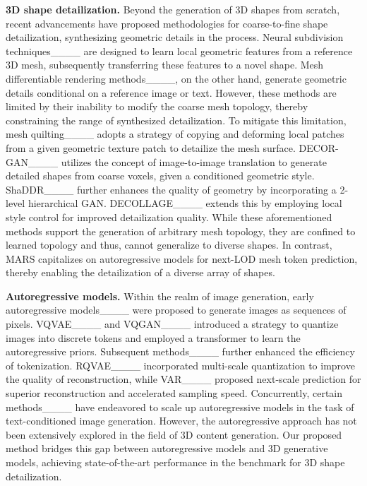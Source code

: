 \noindent\textbf{3D shape detailization.}
Beyond the generation of 3D shapes from scratch, recent advancements have proposed methodologies for coarse-to-fine shape detailization, synthesizing geometric details in the process. Neural subdivision techniques____ are designed to learn local geometric features from a reference 3D mesh, subsequently transferring these features to a novel shape. Mesh differentiable rendering methods____, on the other hand, generate geometric details conditional on a reference image or text. However, these methods are limited by their inability to modify the coarse mesh topology, thereby constraining the range of synthesized detailization. To mitigate this limitation, mesh quilting____ adopts a strategy of copying and deforming local patches from a given geometric texture patch to detailize the mesh surface. DECOR-GAN____ utilizes the concept of image-to-image translation to generate detailed shapes from coarse voxels, given a conditioned geometric style. ShaDDR____ further enhances the quality of geometry by incorporating a 2-level hierarchical GAN. DECOLLAGE____ extends this by employing local style control for improved detailization quality. While these aforementioned methods support the generation of arbitrary mesh topology, they are confined to learned topology and thus, cannot generalize to diverse shapes. In contrast, MARS capitalizes on autoregressive models for next-LOD mesh token prediction, thereby enabling the detailization of a diverse array of shapes.

\noindent\textbf{Autoregressive models.}
Within the realm of image generation, early autoregressive models____ were proposed to generate images as sequences of pixels. VQVAE____ and VQGAN____ introduced a strategy to quantize images into discrete tokens and employed a transformer to learn the autoregressive priors. Subsequent methods____ further enhanced the efficiency of tokenization. RQVAE____ incorporated multi-scale quantization to improve the quality of reconstruction, while VAR____ proposed next-scale prediction for superior reconstruction and accelerated sampling speed. Concurrently, certain methods____ have endeavored to scale up autoregressive models in the task of text-conditioned image generation. However, the autoregressive approach has not been extensively explored in the field of 3D content generation. Our proposed method bridges this gap between autoregressive models and 3D generative models, achieving state-of-the-art performance in the benchmark for 3D shape detailization.
